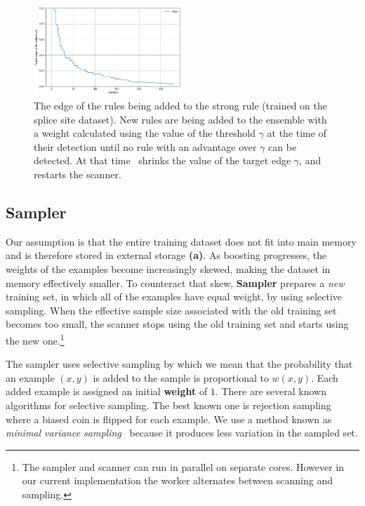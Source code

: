 \begin{figure}
\centering
    \includegraphics[width=0.5\textwidth]{figs/edge.png}
    \caption{The edge of the rules being added to the strong rule
    (trained on the splice site dataset).
    New rules are being added to the ensemble with a weight calculated
    using the value of the threshold $\gamma$ at the time of their
    detection until no rule with an advantage over $\gamma$ can be detected.
    At that time \Sparrow\ shrinks the value of the target edge $\gamma$,
    and restarts the scanner.\label{fig:edge}}
    \vspace{0pt}
\end{figure}


\subsection*{Sampler}

Our assumption is that the entire training dataset does
not fit into main memory and is therefore stored in external storage
{\bf (a)}. As boosting progresses, the weights of the examples become
increasingly skewed, making the dataset in memory effectively smaller.
To counteract that skew, {\bf Sampler} prepares a {\em new}
training set, in which all of the examples have equal weight, by using
selective sampling. When the effective sample size associated
with the old training set becomes too small, the scanner stops using
the old training set and starts using the new one.\footnote{The
  sampler and scanner can run in parallel on separate cores. However in
  our current implementation the worker alternates between scanning and
  sampling.}

The sampler uses selective sampling by which we mean that the
probability that an example $(x,y)$ is added to the sample is
proportional to $w(x,y)$. Each added example is assigned an initial
{\bf weight} of $1$.
{There are several known algorithms
  for selective sampling. The best known one is rejection sampling
  where a biased coin is flipped for each example. We use a method
  known as \textit{minimal variance sampling}~\cite{kitagawa_monte_1996}
  because it produces less variation in the sampled set.}
  
